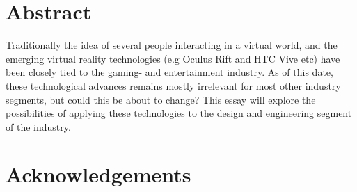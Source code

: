 \chapter*{Abstract}                    
Traditionally the idea of several people interacting in a virtual world, and the emerging virtual reality technologies (e.g Oculus Rift and HTC Vive etc) have been 
closely tied to the gaming- and entertainment industry. 
As of this date, these technological advances remains mostly irrelevant for most other industry segments, but could this be about to change? 
This essay will explore the possibilities of applying these technologies to the design and engineering segment of the industry.

\chapter*{Acknowledgements}  
